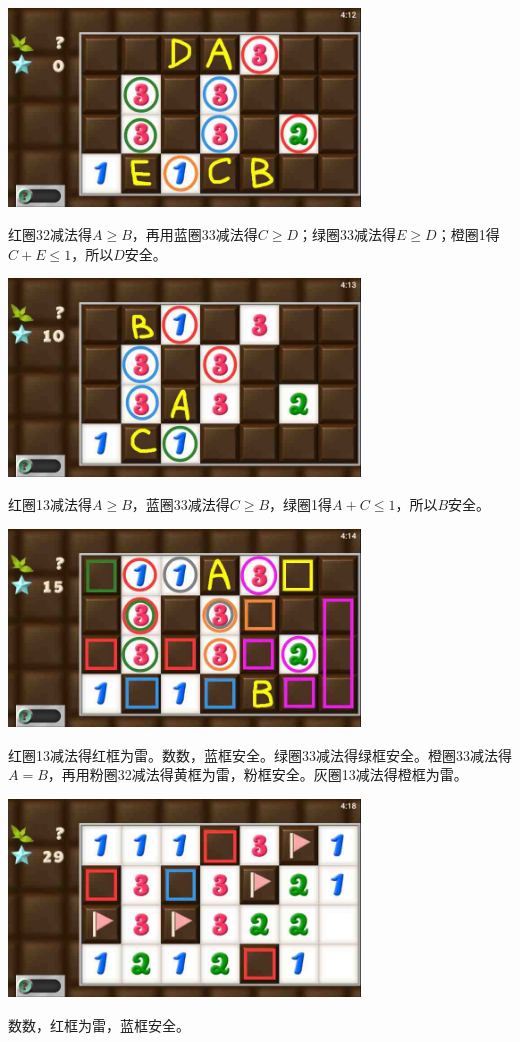 \subsection{} %
\begin{center}
    \includegraphics[width=0.7\textwidth]{puzzlelow/208-1.jpg}
\end{center}
红圈32减法得$A\ge B$，再用蓝圈33减法得$C\ge D$；绿圈33减法得$E\ge D$；橙圈1得$C+E\le 1$，所以$D$安全。
\begin{center}
    \includegraphics[width=0.7\textwidth]{puzzlelow/208-2.jpg}
\end{center}
红圈13减法得$A\ge B$，蓝圈33减法得$C\ge B$，绿圈1得$A+C\le 1$，所以$B$安全。
\begin{center}
    \includegraphics[width=0.7\textwidth]{puzzlelow/208-3.jpg}
\end{center}
红圈13减法得红框为雷。数数，蓝框安全。绿圈33减法得绿框安全。橙圈33减法得$A=B$，再用粉圈32减法得黄框为雷，粉框安全。灰圈13减法得橙框为雷。
\begin{center}
    \includegraphics[width=0.7\textwidth]{puzzlelow/208-4.jpg}
\end{center}
数数，红框为雷，蓝框安全。

